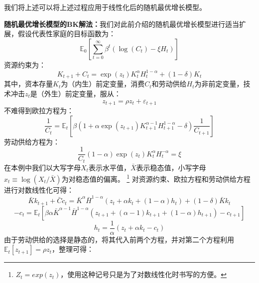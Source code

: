 我们将上述可以将上述过程应用于线性化后的随机最优增长模型。
\begin{example}
    \textbf{随机最优增长模型的BK解法：}我们对此前介绍的随机最优增长模型进行适当扩展，假设代表性家庭的目标函数为：
    \begin{equation*}
        \mathbb{E}_0\left[\sum_{t=0}^{\infty} \beta^t\left(\log \left(C_t\right)-\xi H_t\right)\right]
    \end{equation*}
    资源约束为：
    \begin{equation*}
        K_{t+1}+C_t=\exp \left(z_t\right) K_t^\alpha H_t^{1-\alpha}+(1-\delta) K_t
    \end{equation*}
    其中，资本存量$K_t$为（内生）前定变量，消费$C_t$和劳动供给$H_t$为非前定变量，技术冲击$z_t$是（外生）前定变量，服从：
    \begin{equation*}
        z_{t+1} = \rho z_t + \varepsilon_{t+1}
    \end{equation*}
    不难得到欧拉方程为：
    \begin{equation*}
        \frac{1}{C_t} = \mathbb{E}_t\left[\beta
            \left(1+\alpha \exp \left(z_{t+1}\right) K_{t+1}^{\alpha-1} H_{t+1}^{1-\alpha}-\delta\right) 
                \frac{1}{C_{t+1}}\right]
    \end{equation*}
    劳动供给方程为：
    \begin{equation*}
        \frac{1}{C_t}(1-\alpha) \exp \left(z_t\right) K_t^\alpha H_t^{-\alpha}=\xi
    \end{equation*}
    在本例中我们以大写字母$X_t$表示水平值，$\bar{X}$表示稳态值，小写字母$x_t\equiv \log(X_t/\bar{X})$为对稳态值的偏离。
    \footnote{$Z_t = exp(z_t)$，使用这种记号只是为了对数线性化时书写的方便。}
    对资源约束、欧拉方程和劳动供给方程进行对数线性化可得：
    \begin{equation*}
        \bar{K} k_{t+1}+\bar{C} c_t = 
            \bar{K}^\alpha \bar{H}^{1-\alpha}\left(z_t+\alpha k_t+(1-\alpha) h_t\right)+(1-\delta) \bar{K} k_t
    \end{equation*}
    \begin{equation*}
        -c_t = \mathbb{E}_t
            \left[\beta \alpha \bar{K}^{\alpha-1} \bar{H}^{1-\alpha}
                \left(z_{t+1}+(\alpha-1) k_{t+1}+(1-\alpha) h_{t+1}\right)-c_{t+1}\right]
    \end{equation*}
    \begin{equation*}
        h_t = \frac{1}{\alpha}(z_t+\alpha k_t - c_t)
    \end{equation*}
    由于劳动供给的选择是静态的，将其代入前两个方程，并对第二个方程利用$\mathbb{E}_t [z_{t+1}] = \rho z_t$，整理可得：

\end{example}
